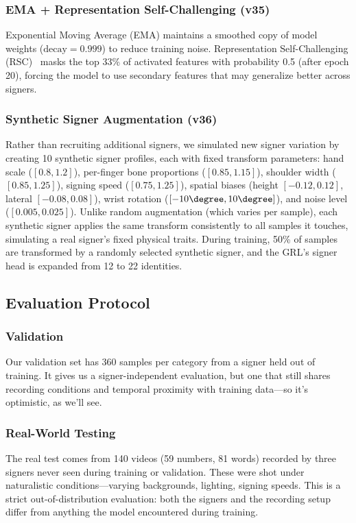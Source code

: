 \documentclass[conference]{IEEEtran}
\begin{document}
\subsubsection{EMA + Representation Self-Challenging (v35)}
Exponential Moving Average (EMA) maintains a smoothed copy of model weights ($\text{decay}=0.999$) to reduce training noise. Representation Self-Challenging (RSC)~\cite{huang2020rsc} masks the top 33\% of activated features with probability 0.5 (after epoch 20), forcing the model to use secondary features that may generalize better across signers.

\subsubsection{Synthetic Signer Augmentation (v36)}
Rather than recruiting additional signers, we simulated new signer variation by creating 10 synthetic signer profiles, each with fixed transform parameters: hand scale ($[0.8, 1.2]$), per-finger bone proportions ($[0.85, 1.15]$), shoulder width ($[0.85, 1.25]$), signing speed ($[0.75, 1.25]$), spatial biases (height $[-0.12, 0.12]$, lateral $[-0.08, 0.08]$), wrist rotation ($[-10\degree, 10\degree]$), and noise level ($[0.005, 0.025]$). Unlike random augmentation (which varies per sample), each synthetic signer applies the same transform consistently to all samples it touches, simulating a real signer's fixed physical traits. During training, 50\% of samples are transformed by a randomly selected synthetic signer, and the GRL's signer head is expanded from 12 to 22 identities.

\subsection{Evaluation Protocol}

\subsubsection{Validation}
Our validation set has 360 samples per category from a signer held out of training. It gives us a signer-independent evaluation, but one that still shares recording conditions and temporal proximity with training data---so it's optimistic, as we'll see.

\subsubsection{Real-World Testing}
The real test comes from 140 videos (59 numbers, 81 words) recorded by three signers never seen during training or validation. These were shot under naturalistic conditions---varying backgrounds, lighting, signing speeds. This is a strict out-of-distribution evaluation: both the signers and the recording setup differ from anything the model encountered during training.
\end{document}
